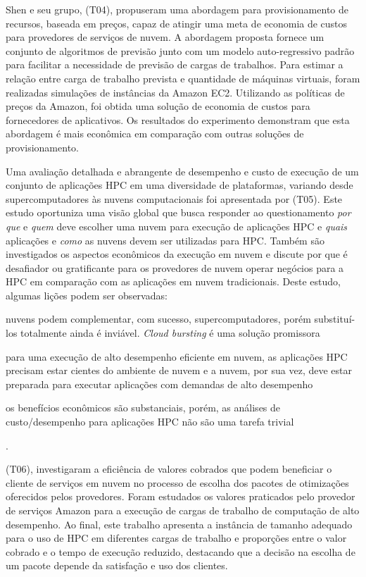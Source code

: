 \documentclass[tese,capa]{texufpel}
\begin{document}
Shen e seu grupo, \cite{shenCostOptimizedResourceProvision2014b} (T04), propuseram uma abordagem para provisionamento de recursos, baseada em preços, capaz de atingir uma meta de economia de custos para provedores de serviços de nuvem. A abordagem proposta fornece um conjunto de algoritmos de previsão junto com um modelo auto-regressivo padrão para facilitar a necessidade de previsão de cargas de trabalhos. Para estimar a relação entre carga de trabalho prevista e quantidade de máquinas virtuais, foram realizadas simulações de instâncias da Amazon EC2. Utilizando as políticas de preços da Amazon, foi obtida uma solução de economia de custos para fornecedores de aplicativos. Os resultados do experimento demonstram que esta abordagem é mais econômica em comparação com outras soluções de provisionamento.

Uma avaliação detalhada e abrangente de desempenho e custo de execução de um conjunto de aplicações HPC em uma diversidade de plataformas, variando desde supercomputadores às nuvens computacionais foi apresentada por \cite{guptaEvaluatingImprovingPerformance2016d} (T05). Este estudo oportuniza uma visão global que busca responder ao questionamento \emph{por que} e \emph{quem} deve escolher uma nuvem para execução de aplicações HPC e \emph{quais} aplicações e \emph{como} as nuvens devem ser utilizadas para HPC. Também são investigados os aspectos econômicos da execução em nuvem e discute por que é desafiador ou gratificante para os provedores de nuvem operar negócios para a HPC em comparação com as aplicações em nuvem tradicionais. Deste estudo, algumas lições podem ser observadas: 
\begin{enumerate*}[label=\textit{\roman*}),itemjoin={{; }},itemjoin*={{; e }}]
  \item nuvens podem complementar, com sucesso, supercomputadores, porém substituí-los totalmente ainda é inviável. \textit{Cloud bursting} é uma solução promissora
  \item para uma execução de alto desempenho eficiente em nuvem, as aplicações HPC precisam estar cientes do ambiente de nuvem e a nuvem, por sua vez, deve estar preparada para executar aplicações com demandas de alto desempenho
  \item os benefícios econômicos são substanciais, porém, as análises de custo/desempenho para aplicações HPC não são uma tarefa trivial
\end{enumerate*}.

\cite{prukkantragornPriceEfficiencyHigh2016b} (T06), investigaram a eficiência de valores cobrados que podem beneficiar o cliente de serviços em nuvem no processo de escolha dos pacotes de otimizações oferecidos pelos provedores. Foram estudados os valores praticados pelo provedor de serviços Amazon para a execução de cargas de trabalho de computação de alto desempenho. Ao final, este trabalho apresenta a instância de tamanho adequado para o uso de HPC em diferentes cargas de trabalho e proporções entre o valor cobrado e o tempo de execução reduzido, destacando que a decisão na escolha de um pacote depende da satisfação e uso dos clientes.
\end{document}
